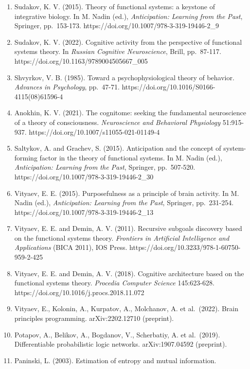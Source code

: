 \documentclass[
  10pt,
]{article}
\begin{document}
\begin{enumerate}
  34:505-507. https://doi.org/10.1023/B:NEAB.0000022638.96382.dd
\item
  Sudakov, K. V. (2015). Theory of functional systems: a keystone of
  integrative biology. In M. Nadin (ed.), \emph{Anticipation: Learning
  from the Past}, Springer, pp.~153-173.
  https://doi.org/10.1007/978-3-319-19446-2\_9
\item
  Sudakov, K. V. (2022). Cognitive activity from the perspective of
  functional systems theory. In \emph{Russian Cognitive Neuroscience},
  Brill, pp.~87-117. https://doi.org/10.1163/9789004505667\_005
\item
  Shvyrkov, V. B. (1985). Toward a psychophysiological theory of
  behavior. \emph{Advances in Psychology}, pp.~47-71.
  https://doi.org/10.1016/S0166-4115(08)61596-4
\item
  Anokhin, K. V. (2021). The cognitome: seeking the fundamental
  neuroscience of a theory of consciousness. \emph{Neuroscience and
  Behavioral Physiology} 51:915-937.
  https://doi.org/10.1007/s11055-021-01149-4
\item
  Saltykov, A. and Grachev, S. (2015). Anticipation and the concept of
  system-forming factor in the theory of functional systems. In M. Nadin
  (ed.), \emph{Anticipation: Learning from the Past}, Springer,
  pp.~507-520. https://doi.org/10.1007/978-3-319-19446-2\_30
\item
  Vityaev, E. E. (2015). Purposefulness as a principle of brain
  activity. In M. Nadin (ed.), \emph{Anticipation: Learning from the
  Past}, Springer, pp.~231-254.
  https://doi.org/10.1007/978-3-319-19446-2\_13
\item
  Vityaev, E. E. and Demin, A. V. (2011). Recursive subgoals discovery
  based on the functional systems theory. \emph{Frontiers in Artificial
  Intelligence and Applications} (BICA 2011), IOS Press.
  https://doi.org/10.3233/978-1-60750-959-2-425
\item
  Vityaev, E. E. and Demin, A. V. (2018). Cognitive architecture based
  on the functional systems theory. \emph{Procedia Computer Science}
  145:623-628. https://doi.org/10.1016/j.procs.2018.11.072
\item
  Vityaev, E., Kolonin, A., Kurpatov, A., Molchanov, A. et al.~(2022).
  Brain principles programming. arXiv:2202.12710 (preprint).
\item
  Potapov, A., Belikov, A., Bogdanov, V., Scherbatiy, A. et al.~(2019).
  Differentiable probabilistic logic networks. arXiv:1907.04592
  (preprint).
\item
  Paninski, L. (2003). Estimation of entropy and mutual information.

\end{enumerate}
\end{document}
